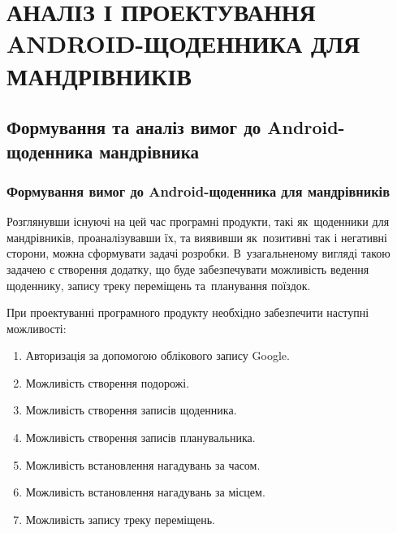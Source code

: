 \documentclass[../main.tex]{subfiles}
\begin{document}
\chapter{АНАЛІЗ І ПРОЕКТУВАННЯ ANDROID-ЩОДЕННИКА ДЛЯ МАНДРІВНИКІВ}

\section{Формування та аналіз вимог до Android-щоденника мандрівника}

\subsection{Формування вимог до Android-щоденника для мандрівників}

Розглянувши існуючі на цей час програмні продукти, такі як~щоденники для мандрівників, проаналізувавши їх, та виявивши як~позитивні так і негативні сторони, можна сформувати задачі розробки. В~узагальненому вигляді такою задачею є створення додатку, що буде забезпечувати можливість ведення щоденнику, запису треку переміщень та~планування поїздок.

При проектуванні програмного продукту необхідно забезпечити наступні можливості:
\begin{enumerate}
	\item Авторизація за допомогою облікового запису Google.
	\item Можливість створення подорожі.
	\item Можливість створення записів щоденника.
	\item Можливість створення записів планувальника.
	\item Можливість встановлення нагадувань за часом.
	\item Можливість встановлення нагадувань за місцем.
	\item Можливість запису треку переміщень.
\end{enumerate}
\end{document}
